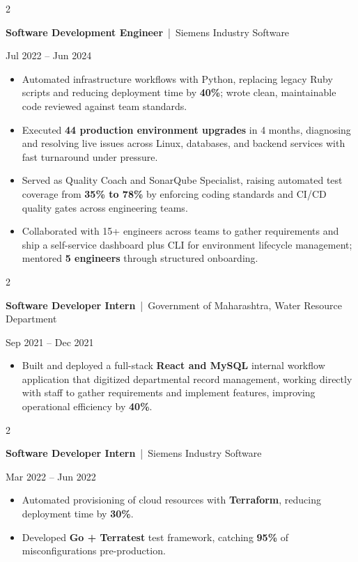 \documentclass[10pt, letterpaper]{article}
\newenvironment{highlights}{
    \begin{itemize}[
        topsep=0.10 cm,
        parsep=0.06 cm,
        partopsep=0pt,
        itemsep=0.06 cm,
        leftmargin=12pt
    ]
}{
    \end{itemize}
}
\newenvironment{twocolentry}[2][]{
    \onecolentry
    \def\secondColumn{#2}
    \setcolumnwidth{\fill, 4.5 cm}
    \begin{paracol}{2}
}{
    \switchcolumn \raggedleft \secondColumn
    \end{paracol}
    \endonecolentry
}
\begin{document}
\vspace{0.15 cm}

\begin{twocolentry}{Jul 2022 -- Jun 2024}
\textbf{Software Development Engineer} \,|\, Siemens Industry Software
\end{twocolentry}
\begin{highlights}
  \item Automated infrastructure workflows with Python, replacing legacy Ruby scripts and reducing deployment time by \textbf{40\%}; wrote clean, maintainable code reviewed against team standards.
  \item Executed \textbf{44 production environment upgrades} in 4 months, diagnosing and resolving live issues across Linux, databases, and backend services with fast turnaround under pressure.
  \item Served as Quality Coach and SonarQube Specialist, raising automated test coverage from \textbf{35\% to 78\%} by enforcing coding standards and CI/CD quality gates across engineering teams.
  \item Collaborated with 15+ engineers across teams to gather requirements and ship a self-service dashboard plus CLI for environment lifecycle management; mentored \textbf{5 engineers} through structured onboarding.
\end{highlights}

\vspace{0.15 cm}

\begin{twocolentry}{Sep 2021 -- Dec 2021}
\textbf{Software Developer Intern} \,|\, Government of Maharashtra, Water Resource Department
\end{twocolentry}
\begin{highlights}
  \item Built and deployed a full-stack \textbf{React and MySQL} internal workflow application that digitized departmental record management, working directly with staff to gather requirements and implement features, improving operational efficiency by \textbf{40\%}.
\end{highlights}

\vspace{0.15 cm}

\begin{twocolentry}{Mar 2022 -- Jun 2022}
\textbf{Software Developer Intern} \,|\, Siemens Industry Software
\end{twocolentry}
\begin{highlights}
  \item Automated provisioning of cloud resources with \textbf{Terraform}, reducing deployment time by \textbf{30\%}.
  \item Developed \textbf{Go + Terratest} test framework, catching \textbf{95\%} of misconfigurations pre-production.
\end{highlights}
\end{document}
